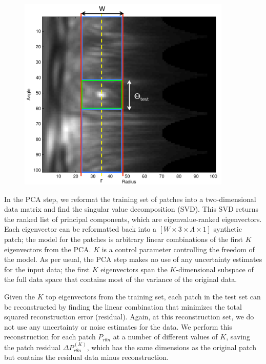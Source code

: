 \documentclass[12pt,pdftex,preprint]{aastex}
\begin{document}
\begin{figure}[h!]
\begin{center}
\includegraphics[width=4in]{figs/explain.pdf}
\end{center}
\vspace{-7mm}
\caption{}
\label{fig:spectrum}
\end{figure}
 

In the PCA step, we reformat the training set of patches into a
two-dimensional data matrix and find the singular value decomposition
(SVD).  This SVD returns the ranked list of principal components,
which are eigenvalue-ranked eigenvectors.  Each eigenvector can be
reformatted back into a $[W\times 3\times\Lambda\times 1]$ synthetic
patch; the model for the patches is arbitrary linear combinations of
the first $K$ eigenvectors from the PCA.  $K$ is a control parameter
controlling the freedom of the model.  As per usual, the PCA step
makes no use of any uncertainty estimates for the input data; the
first $K$ eigenvectors span the $K$-dimensional subspace of the full
data space that contains most of the variance of the original data.

Given the $K$ top eigenvectors from the training set, each patch in
the test set can be reconstructed by finding the linear combination
that minimizes the total squared reconstruction error (residual).
Again, at this reconstruction set, we do not use any uncertainty or
noise estimates for the data.  We perform this reconstruction for each
patch $P_{r \theta n}$ at a number of different values of $K$, saving
the patch residual $\Delta P^{(K)}_{r \theta n}$, which has the same
dimensions as the original patch but contains the residual data minus
reconstruction.
\end{document}
